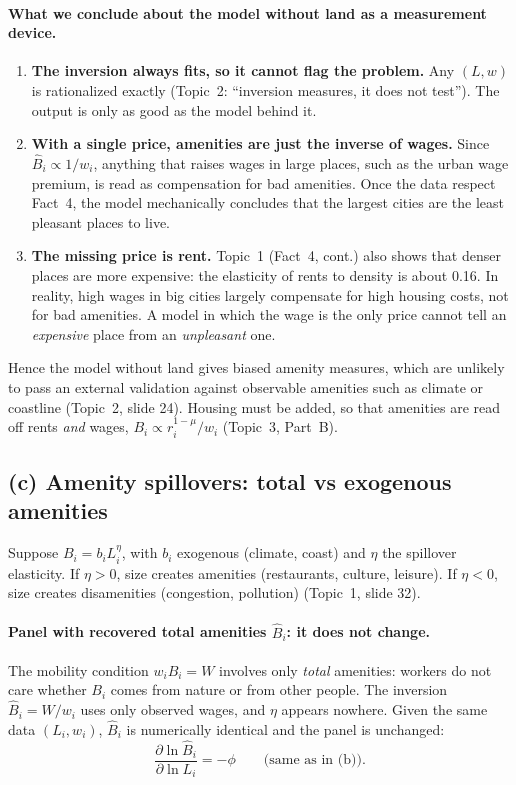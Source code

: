 \documentclass[11pt,a4paper]{article}
\begin{document}
\paragraph{What we conclude about the model without land as a measurement device.}
\begin{enumerate}[leftmargin=1.5em]
    \item \textbf{The inversion always fits, so it cannot flag the problem.} Any $(L,w)$ is rationalized exactly (Topic~2: ``inversion measures, it does not test''). The output is only as good as the model behind it.
    \item \textbf{With a single price, amenities are just the inverse of wages.} Since $\hat B_i \propto 1/w_i$, anything that raises wages in large places, such as the urban wage premium, is read as compensation for bad amenities. Once the data respect Fact~4, the model mechanically concludes that the largest cities are the least pleasant places to live.
    \item \textbf{The missing price is rent.} Topic~1 (Fact~4, cont.) also shows that denser places are more expensive: the elasticity of rents to density is about 0.16. In reality, high wages in big cities largely compensate for high housing costs, not for bad amenities. A model in which the wage is the only price cannot tell an \emph{expensive} place from an \emph{unpleasant} one.
\end{enumerate}
Hence the model without land gives biased amenity measures, which are unlikely to pass an external validation against observable amenities such as climate or coastline (Topic~2, slide 24). Housing must be added, so that amenities are read off rents \emph{and} wages, $B_i \propto r_i^{1-\mu}/w_i$ (Topic~3, Part~B).

\subsection*{(c) Amenity spillovers: total vs exogenous amenities}

Suppose $B_i = b_i L_i^{\eta}$, with $b_i$ exogenous (climate, coast) and $\eta$ the spillover elasticity. If $\eta > 0$, size creates amenities (restaurants, culture, leisure). If $\eta < 0$, size creates disamenities (congestion, pollution) (Topic~1, slide 32).

\paragraph{Panel with recovered total amenities $\hat B_i$: it does not change.}
The mobility condition $w_i B_i = W$ involves only \emph{total} amenities: workers do not care whether $B_i$ comes from nature or from other people. The inversion $\hat B_i = W/w_i$ uses only observed wages, and $\eta$ appears nowhere. Given the same data $(L_i, w_i)$, $\hat B_i$ is numerically identical and the panel is unchanged:
\begin{equation}
    \frac{\partial \ln \hat B_i}{\partial \ln L_i} = -\phi \qquad \text{(same as in (b))}.
\end{equation}
\end{document}
